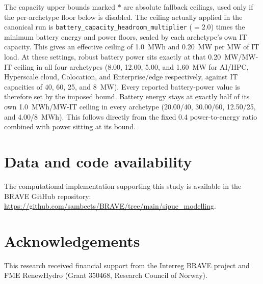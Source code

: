 \documentclass[preprint,12pt]{elsarticle}
\begin{document}
The capacity upper bounds marked $\ast$ are absolute fallback ceilings, used only if the per-archetype floor below is disabled. The ceiling actually applied in the canonical run is \texttt{battery\_capacity\_headroom\_multiplier} ($=2.0$) times the minimum battery energy and power floors, scaled by each archetype's own IT capacity. This gives an effective ceiling of 1.0~MWh and 0.20~MW per MW of IT load. At these settings, robust battery power sits exactly at that 0.20~MW/MW-IT ceiling in all four archetypes (8.00, 12.00, 5.00, and 1.60~MW for AI/HPC, Hyperscale cloud, Colocation, and Enterprise/edge respectively, against IT capacities of 40, 60, 25, and 8~MW). Every reported battery-power value is therefore set by the imposed bound. Battery energy stays at exactly half of its own 1.0~MWh/MW-IT ceiling in every archetype (20.00/40, 30.00/60, 12.50/25, and 4.00/8~MWh). This follows directly from the fixed 0.4 power-to-energy ratio combined with power sitting at its bound.


\section*{Data and code availability}

The computational implementation supporting this study is available in the BRAVE GitHub repository:
\url{https://github.com/sambeets/BRAVE/tree/main/sipue_modelling}.


\section*{Acknowledgements}
This research received financial support from the Interreg BRAVE project and FME RenewHydro (Grant 350468, Research Council of Norway).



\end{document}

